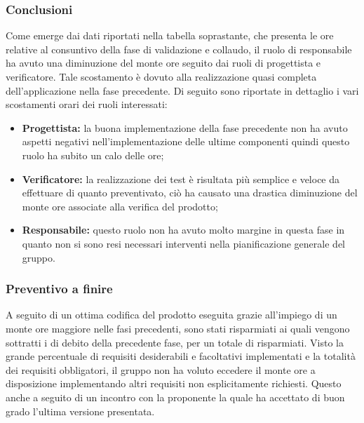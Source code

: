 \subsubsection{Conclusioni}
Come emerge dai dati riportati nella tabella soprastante, che presenta le ore relative al consuntivo della fase di validazione e collaudo, il ruolo di responsabile ha avuto una diminuzione del monte ore seguito dai ruoli di progettista e verificatore. Tale scostamento è dovuto alla realizzazione quasi completa dell'applicazione nella fase precedente. Di seguito sono riportate in dettaglio i vari scostamenti orari dei ruoli interessati:
\begin{itemize}
	\item \textbf{Progettista:} la buona implementazione della fase precedente non ha avuto aspetti negativi nell'implementazione delle ultime componenti quindi questo ruolo ha subito un calo delle ore; 
	\item \textbf{Verificatore:} la realizzazione dei test è risultata più semplice e veloce da effettuare di quanto preventivato, ciò ha causato una drastica diminuzione del monte ore associate alla verifica del prodotto;
	\item \textbf{Responsabile:} questo ruolo non ha avuto molto margine in questa fase in quanto non si sono resi necessari interventi nella pianificazione generale del gruppo.
\end{itemize}

\subsubsection{Preventivo a finire}
A seguito di un ottima codifica del prodotto eseguita grazie all'impiego di un monte ore maggiore nelle fasi precedenti, sono stati risparmiati  ai quali vengono sottratti i  di debito della precedente fase, per un totale di  risparmiati. Visto la grande percentuale di requisiti desiderabili e facoltativi implementati e la totalità dei requisiti obbligatori, il gruppo non ha voluto eccedere il monte ore a disposizione implementando altri requisiti non esplicitamente richiesti. Questo anche a seguito di un incontro con la proponente la quale ha accettato di buon grado l'ultima versione presentata.


